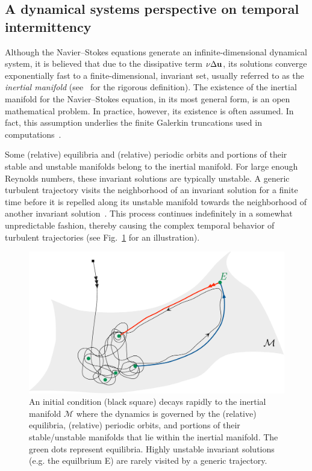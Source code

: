 \documentclass{article}
\begin{document}
\subsection{A dynamical systems perspective on temporal intermittency}\label{sec:inter_DS}
Although the Navier--Stokes equations generate an infinite-dimensional dynamical system,
it is believed that due to the dissipative term $\nu\Delta\mathbf u$, its
solutions converge exponentially fast to a
finite-dimensional, invariant set, usually referred to as the \emph{inertial manifold}
(see~\cite{const12} for the rigorous definition). The existence of the
inertial manifold for the Navier--Stokes equation, in its most general form,
is an open mathematical problem. In
practice, however, its existence is often assumed. In fact, this assumption
underlies the finite Galerkin truncations used in computations~\citep{foias88}.

Some (relative) equilibria
and (relative) periodic orbits and portions of their stable and unstable manifolds
belong to the inertial manifold.
For large enough Reynolds numbers, these invariant solutions
are typically unstable. A generic turbulent trajectory visits the neighborhood of an invariant
solution
for a finite time before it is repelled along its unstable manifold towards
the neighborhood of another invariant solution~\citep{ruelle91,HGCV09}.
This process continues indefinitely
in a somewhat unpredictable fashion, thereby causing the complex temporal behavior of
turbulent trajectories (see Fig.~\ref{fig:IM} for an illustration).
%
\begin{figure}
\centering
\includegraphics[width=.85\textwidth]{inertial_man}
\caption{An initial condition (black square) decays rapidly to the
inertial manifold $\mathcal M$ where the dynamics is governed by the (relative) equilibria,
(relative) periodic orbits, and portions
of their stable/unstable manifolds that
lie within the inertial manifold. The green dots represent equilibria.
Highly unstable invariant solutions (e.g. the equilbrium E)
are rarely visited by a generic trajectory.}
\label{fig:IM}
\end{figure}
\end{document}
